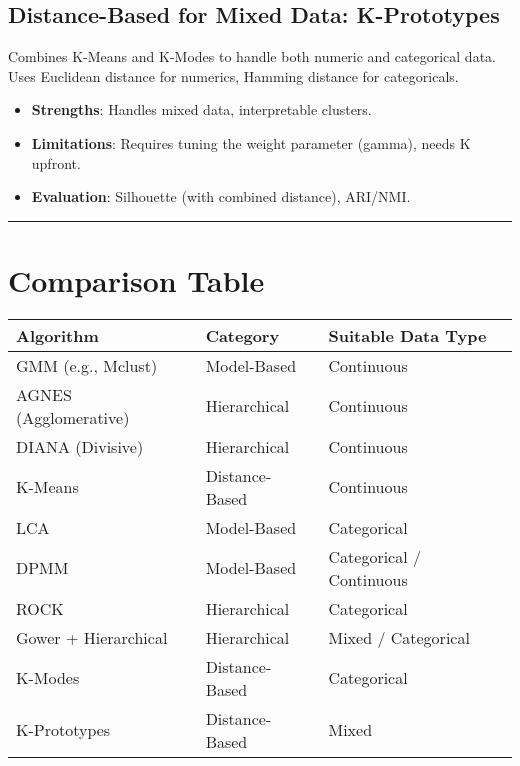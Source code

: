 \documentclass[
  letterpaper,
  DIV=11,
  numbers=noendperiod]{scrartcl}
\providecommand{\tightlist}{%
  \setlength{\itemsep}{0pt}\setlength{\parskip}{0pt}}\usepackage{longtable,booktabs,array}
\begin{document}
\subsection{Distance-Based for Mixed Data:
K-Prototypes}\label{distance-based-for-mixed-data-k-prototypes}

Combines K-Means and K-Modes to handle both numeric and categorical
data. Uses Euclidean distance for numerics, Hamming distance for
categoricals.

\begin{itemize}
\tightlist
\item
  \textbf{Strengths}: Handles mixed data, interpretable clusters.
\item
  \textbf{Limitations}: Requires tuning the weight parameter (gamma),
  needs K upfront.
\item
  \textbf{Evaluation}: Silhouette (with combined distance), ARI/NMI.
\end{itemize}

\begin{center}\rule{0.5\linewidth}{0.5pt}\end{center}

\section{Comparison Table}\label{comparison-table}

\begin{longtable}[]{@{}lll@{}}
\toprule\noalign{}
Algorithm & Category & Suitable Data Type \\
\midrule\noalign{}
\endhead
\bottomrule\noalign{}
\endlastfoot
GMM (e.g., Mclust) & Model-Based & Continuous \\
AGNES (Agglomerative) & Hierarchical & Continuous \\
DIANA (Divisive) & Hierarchical & Continuous \\
K-Means & Distance-Based & Continuous \\
LCA & Model-Based & Categorical \\
DPMM & Model-Based & Categorical / Continuous \\
ROCK & Hierarchical & Categorical \\
Gower + Hierarchical & Hierarchical & Mixed / Categorical \\
K-Modes & Distance-Based & Categorical \\
K-Prototypes & Distance-Based & Mixed \\
\end{longtable}
\end{document}
